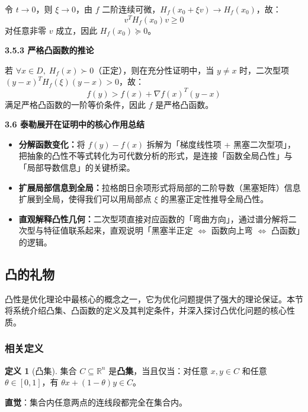 \documentclass[10pt]{article}
\numberwithin{equation}{section}
\theoremstyle{plain}
\theoremstyle{definition}
\newtheorem{definition}[theorem]{定义}
\theoremstyle{remark}
\newcommand{\R}{\mathbb{R}}
\begin{document}
令 $t\to 0$，则 $\xi\to 0$，由 $f$ 二阶连续可微，$H_f(x_0+\xi v)\to H_f(x_0)$，故：
\[v^TH_f(x_0)v\geq 0\]
对任意非零 $v$ 成立，因此 $H_f(x_0)\succeq 0$。

\textbf{3.5.3 严格凸函数的推论}

若 $\forall x\in D,\;H_f(x)\succ 0$（正定），则在充分性证明中，当 $y\neq x$ 时，二次型项 $(y-x)^TH_f(\xi)(y-x)>0$，故：
\[f(y)>f(x)+\nabla f(x)^T(y-x)\]
满足严格凸函数的一阶等价条件，因此 $f$ 是严格凸函数。

\textbf{3.6 泰勒展开在证明中的核心作用总结}

\begin{itemize}
	\item \textbf{分解函数变化：}将 $f(y)-f(x)$ 拆解为「梯度线性项 + 黑塞二次型项」，把抽象的凸性不等式转化为可代数分析的形式，是连接「函数全局凸性」与「局部导数信息」的关键桥梁。
	\item \textbf{扩展局部信息到全局：}拉格朗日余项形式将局部的二阶导数（黑塞矩阵）信息扩展到全局，使得我们可以用局部点 $\xi$ 的黑塞正定性推导全局凸性。
	\item \textbf{直观解释凸性几何：}二次型项直接对应函数的「弯曲方向」，通过谱分解将二次型与特征值联系起来，直观说明「黑塞半正定 $\Leftrightarrow$ 函数向上弯 $\Leftrightarrow$ 凸函数」的逻辑。
\end{itemize}

\subsection{凸的礼物}

凸性是优化理论中最核心的概念之一，它为优化问题提供了强大的理论保证。本节将系统介绍凸集、凸函数的定义及其判定条件，并深入探讨凸优化问题的核心性质。

\subsubsection{相关定义}

\begin{definition}[凸集]
	集合 $C \subseteq \R^n$ 是\textbf{凸集}，当且仅当：对任意 $x, y \in C$ 和任意 $\theta \in [0, 1]$，有 $\theta x + (1-\theta) y \in C$。
\end{definition}

\textbf{直觉}：集合内任意两点的连线段都完全在集合内。
\end{document}
